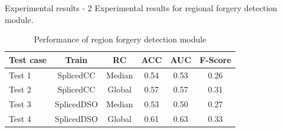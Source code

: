 \begin{tframe}{Experimental results - 2}
Experimental results for regional forgery detection module. 
\begin{footnotesize}
\begin{table}[h!]
\centering
\begin{tabular}{l c c c c c} 
\hline \hline 
\textbf{Test case} & \textbf{Train} & \textbf{RC} & \textbf{ACC} & \textbf{AUC} &\textbf{ F-Score} \\ [0.5ex]
\hline
Test 1 & SplicedCC & Median & 0.54 & 0.53 & 0.26\\
Test 2 & SplicedCC & Global & 0.57 & 0.57 & 0.31\\
Test 3 &	 SplicedDSO & Median & 0.53 & 0.50 & 0.27\\
Test 4 &	 SplicedDSO & Global & 0.61 & 0.63 & 0.33\\ [1ex]
\hline
\end{tabular}
\caption{Performance of region forgery detection module}
\label{table:performanceregionaldet}
\end{table}
\end{footnotesize}
\end{tframe}

